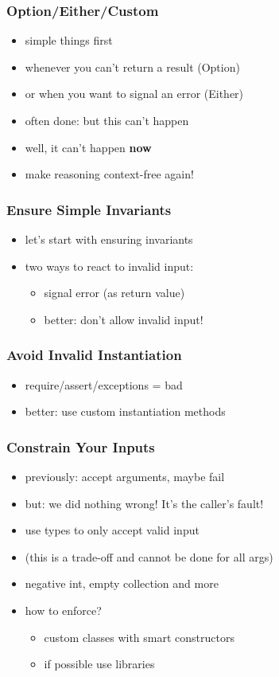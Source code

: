 \documentclass{beamer}
\begin{document}
\begin{frame}
  \frametitle{Option/Either/Custom}
  \begin{itemize}
  \item simple things first
  \item whenever you can't return a result (Option)
  \item or when you want to signal an error (Either)
  \item often done: but this can't happen
  \item well, it can't happen \textbf{now}
  \item make reasoning context-free again!
  \end{itemize}
\end{frame}

\begin{frame}
  \frametitle{Ensure Simple Invariants}
  \begin{itemize}
  \item let's start with ensuring invariants
  \item two ways to react to invalid input:
    \begin{itemize}
    \item signal error (as return value)
    \item better: don't allow invalid input!
    \end{itemize}
  \end{itemize}
\end{frame}

\begin{frame}
  \frametitle{Avoid Invalid Instantiation}
  \begin{itemize}
  \item require/assert/exceptions = bad
  \item better: use custom instantiation methods
  \end{itemize}
\end{frame}

\begin{frame}
  \frametitle{Constrain Your Inputs}
  \begin{itemize}
  \item previously: accept arguments, maybe fail
  \item but: we did nothing wrong!  It's the caller's fault!
  \item use types to only accept valid input
  \item (this is a trade-off and cannot be done for all args)
  \item negative int, empty collection and more
  \item how to enforce?
    \begin{itemize}
    \item custom classes with smart constructors
    \item if possible use libraries
    \end{itemize}
  \end{itemize}
\end{frame}
\end{document}
